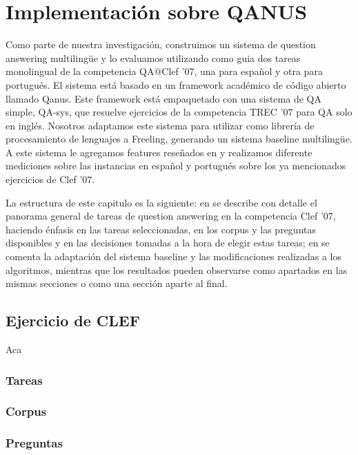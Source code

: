 \chapter{Implementación sobre QANUS}
\label{chap:qanus}
Como parte de nuestra investigación, construimos un sistema de question answering multilingüe y lo evaluamos utilizando como guia dos tareas monolingual de la competencia QA@Clef '07, una para español y otra para portugués. El sistema está basado en un framework académico de código abierto llamado Qanus. Este framework está empaquetado con una sistema de QA simple, QA-sys, que resuelve ejercicios de la competencia TREC '07 para QA solo en inglés. Nosotros adaptamos este sistema para utilizar como librería de procesamiento de lenguajes a Freeling, generando un sistema baseline multilingüe. A este sistema le agregamos features reseñados en  y realizamos diferente mediciones sobre las instancias en español y portugués sobre los ya mencionados ejercicios de Clef '07.

La estructura de este capitulo es la siguiente: en  se describe con detalle el panorama general de tareas de question answering en la competencia Clef '07, haciendo énfasis en las tareas seleccionadas, en los corpus y las preguntas disponibles y en las decisiones tomadas a la hora de elegir estas tareas; en  se comenta la adaptación del sistema baseline y las modificaciones realizadas a los algoritmos, {\color{red}mientras que los resultados pueden observarse como apartados en las mismas secciones o como una sección aparte al final}.

\section{Ejercicio de CLEF}
\label{sec:ejecicio-de-clef}
Aca
\subsection{Tareas}
\subsection{Corpus}
\subsection{Preguntas}

